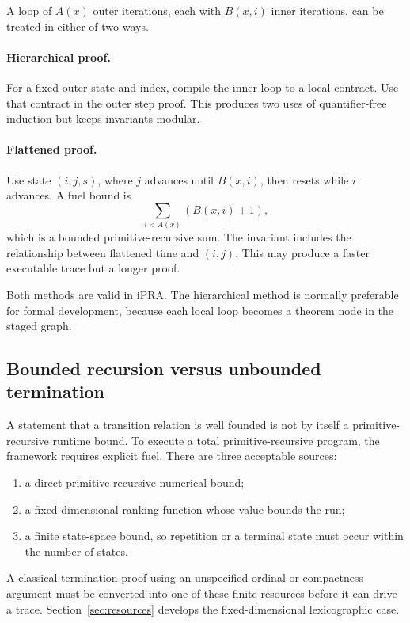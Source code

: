A loop of \(A(x)\) outer iterations, each with \(B(x,i)\) inner iterations, can be treated in either of two
ways.

\paragraph{Hierarchical proof.}
For a fixed outer state and index, compile the inner loop to a local contract.  Use that contract in the
outer step proof.  This produces two uses of quantifier-free induction but keeps invariants modular.

\paragraph{Flattened proof.}
Use state \((i,j,s)\), where \(j\) advances until \(B(x,i)\), then resets while \(i\) advances.  A fuel
bound is
\[
  \sum_{i<A(x)}(B(x,i)+1),
\]
which is a bounded primitive-recursive sum.  The invariant includes the relationship between flattened time
and \((i,j)\).  This may produce a faster executable trace but a longer proof.

Both methods are valid in iPRA.  The hierarchical method is normally preferable for formal development,
because each local loop becomes a theorem node in the staged graph.

\subsection{Bounded recursion versus unbounded termination}

A statement that a transition relation is well founded is not by itself a primitive-recursive runtime
bound.  To execute a total primitive-recursive program, the framework requires explicit fuel.  There are
three acceptable sources:
\begin{enumerate}
  \item a direct primitive-recursive numerical bound;
  \item a fixed-dimensional ranking function whose value bounds the run;
  \item a finite state-space bound, so repetition or a terminal state must occur within the number of
        states.
\end{enumerate}
A classical termination proof using an unspecified ordinal or compactness argument must be converted into
one of these finite resources before it can drive a trace.  Section~\ref{sec:resources} develops the
fixed-dimensional lexicographic case.

